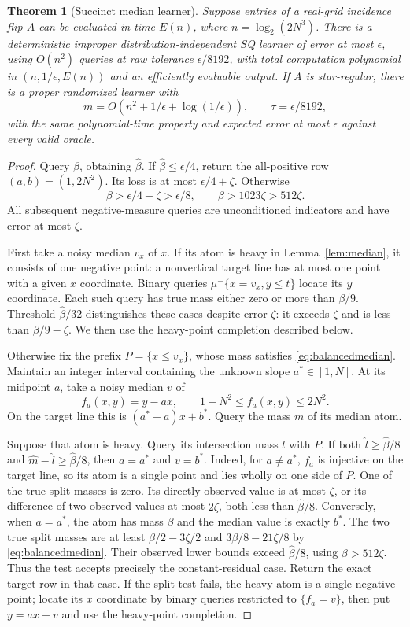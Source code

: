 \documentclass[11pt]{article}
\newtheorem{theorem}{Theorem}
\newcommand{\1}{\mathbf 1}
\begin{document}
\begin{samepage}
\begin{theorem}[Succinct median learner]\label{thm:fast}
Suppose entries of a real-grid incidence flip $A$ can be evaluated in time $E(n)$, where $n=\log_2(2N^3)$. There is a deterministic improper distribution-independent SQ learner of error at most $\epsilon$, using $O(n^2)$ queries at raw tolerance $\epsilon/8192$, with total computation polynomial in $(n,1/\epsilon,E(n))$ and an efficiently evaluable output. If $A$ is star-regular, there is a proper randomized learner with
\[
 m=O(n^2+1/\epsilon+\log(1/\epsilon)),\qquad
 \tau=\epsilon/8192,
\]
with the same polynomial-time property and expected error at most $\epsilon$ against every valid oracle.
\end{theorem}
\end{samepage}
\begin{proof}
Query $\beta$, obtaining $\widehat\beta$. If $\widehat\beta\le\epsilon/4$, return the all-positive row $(a,b)=(1,2N^2)$. Its loss is at most $\epsilon/4+\zeta$. Otherwise
\[
 \beta>\epsilon/4-\zeta>\epsilon/8,
 \qquad \beta>1023\zeta>512\zeta.
\]
All subsequent negative-measure queries are unconditioned indicators and have error at most $\zeta$.

First take a noisy median $v_x$ of $x$. If its atom is heavy in Lemma~\ref{lem:median}, it consists of one negative point: a nonvertical target line has at most one point with a given $x$ coordinate. Binary queries $\mu^-\{x=v_x,y\le t\}$ locate its $y$ coordinate. Each such query has true mass either zero or more than $\beta/9$. Threshold $\widehat\beta/32$ distinguishes these cases despite error $\zeta$: it exceeds $\zeta$ and is less than $\beta/9-\zeta$. We then use the heavy-point completion described below.

Otherwise fix the prefix $P=\{x\le v_x\}$, whose mass satisfies \eqref{eq:balancedmedian}. Maintain an integer interval containing the unknown slope $a^*\in[1,N]$. At its midpoint $a$, take a noisy median $v$ of
\[
 f_a(x,y)=y-ax,
 \qquad 1-N^2\le f_a(x,y)\le2N^2.
\]
On the target line this is $(a^*-a)x+b^*$. Query the mass $m$ of its median atom.

Suppose that atom is heavy. Query its intersection mass $l$ with $P$. If both $\widehat l\ge\widehat\beta/8$ and $\widehat m-\widehat l\ge\widehat\beta/8$, then $a=a^*$ and $v=b^*$. Indeed, for $a\ne a^*$, $f_a$ is injective on the target line, so its atom is a single point and lies wholly on one side of $P$. One of the true split masses is zero. Its directly observed value is at most $\zeta$, or its difference of two observed values at most $2\zeta$, both less than $\widehat\beta/8$. Conversely, when $a=a^*$, the atom has mass $\beta$ and the median value is exactly $b^*$. The two true split masses are at least $\beta/2-3\zeta/2$ and $3\beta/8-21\zeta/8$ by \eqref{eq:balancedmedian}. Their observed lower bounds exceed $\widehat\beta/8$, using $\beta>512\zeta$. Thus the test accepts precisely the constant-residual case. Return the exact target row in that case. If the split test fails, the heavy atom is a single negative point; locate its $x$ coordinate by binary queries restricted to $\{f_a=v\}$, then put $y=ax+v$ and use the heavy-point completion.


\end{proof}
\end{document}
